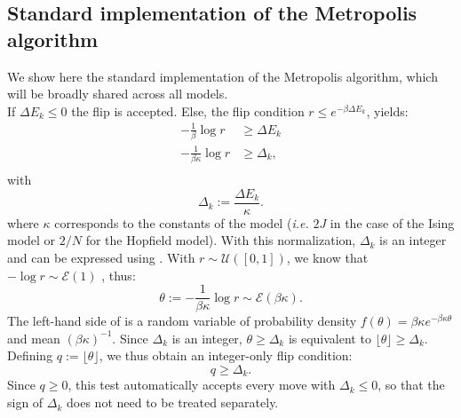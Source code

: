 \subsection{Standard implementation of the Metropolis algorithm}

We show here the standard implementation of the Metropolis algorithm, which will be broadly shared across all models.\\
If $\Delta E_k \leq 0$ the flip is accepted. Else, the flip condition $r \leq e^{-\beta \Delta E_k}$, yields:
\begin{equation}
\begin{aligned}
  -\frac{1}{\beta}\log r &\geq \Delta E_k\\
  -\frac{1}{\beta \kappa}\log r &\geq \Delta_k,\\
\end{aligned}
\label{eq:flip_condition}
\end{equation}
with
\begin{equation}
  \Delta_k := \frac{\Delta E_k}{\kappa}.
  \label{eq:def_lambda}
\end{equation}
where  $\kappa$ corresponds to the constants of the model (\textit{i.e.} $2J$ in the case of the Ising model or $2/N$ for the Hopfield model).
With this normalization, $\Delta_k$ is an integer and can be expressed using \UnsignedInts. With $r \sim \mathcal{U}([0,1])$, we know that $-\log r \sim \mathcal{E}(1)$ , thus:
\begin{equation}
   \theta := -\frac{1}{\beta \kappa}\log r  \sim \mathcal{E}(\beta \kappa).
\end{equation}
The left-hand side of  is a random variable of probability density $f(\theta)=\beta  \kappa e^{-\beta  \kappa \theta}$ and mean $(\beta \kappa)^{-1}$.
Since $\Delta_k$ is an integer, $\theta \geq \Delta_k$ is equivalent to $\lfloor \theta \rfloor \geq \Delta_k$. Defining $q := \lfloor \theta \rfloor $, we thus obtain an integer-only flip condition:
\begin{equation}
 q\geq \Delta_k.
  \label{eq:flip_int}
\end{equation}
Since $q \geq 0$, this test automatically accepts every move with $\Delta_k \leq 0$, so that the sign of $\Delta_k$ does not need to be treated separately.

